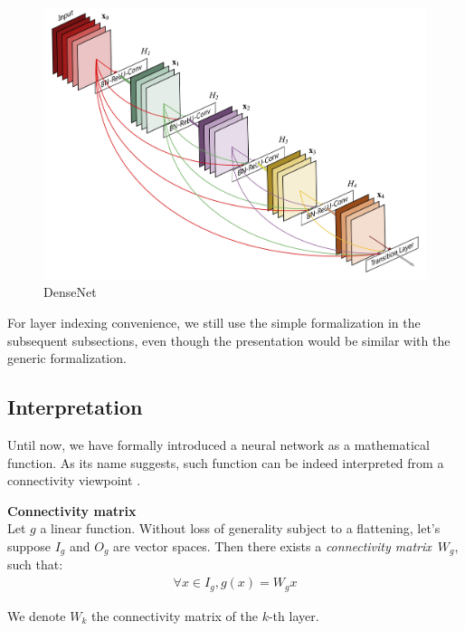 \begin{figure}[tp]
\centering\includegraphics[scale=0.07]{chapter1/densenet.jpg}
\caption{DenseNet \citep{huang2017densely}}
\label{fig:densenet}
\end{figure}

\begin{remark}
For layer indexing convenience, we still use the simple formalization in the subsequent subsections, even though the presentation would be similar with the generic formalization.
\end{remark}

\subsection{Interpretation}

Until now, we have formally introduced a neural network as a mathematical function. As its name suggests, such function can be indeed interpreted from a connectivity viewpoint \citep{lecun-87}.

\begin{definition}\textbf{Connectivity matrix}\\
Let $g$ a linear function. Without loss of generality subject to a flattening, let's suppose $I_g$ and $O_g$ are vector spaces. Then there exists a \emph{connectivity matrix}~$W_g$, such that:
\begin{gather*}
\forall x \in I_g, g(x) = W_g x
\end{gather*}
\end{definition}
We denote $W_k$ the connectivity matrix of the $k$-th layer.


